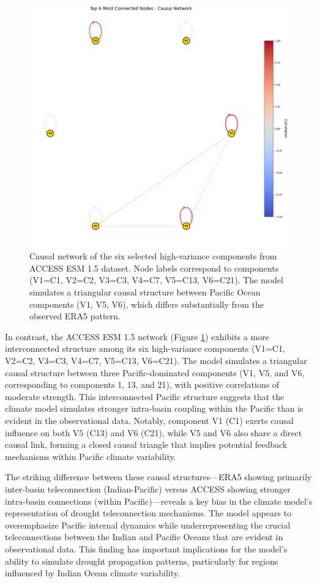 \documentclass[
]{krantz}
\begin{document}
\begin{figure}

{\centering \includegraphics[width=0.49\linewidth]{work/02-causaldisc/figures/ACCESS/ACCESS_causal_net_sel_comp} 

}

\caption{Causal network of the six selected high-variance components from ACCESS ESM 1.5 dataset. Node labels correspond to components (V1=C1, V2=C2, V3=C3, V4=C7, V5=C13, V6=C21). The model simulates a triangular causal structure between Pacific Ocean components (V1, V5, V6), which differs substantially from the observed ERA5 pattern.}\label{fig:figure8}
\end{figure}

In contrast, the ACCESS ESM 1.5 network (Figure \ref{fig:figure8}) exhibits a more interconnected structure among its six high-variance components (V1=C1, V2=C2, V3=C3, V4=C7, V5=C13, V6=C21). The model simulates a triangular causal structure between three Pacific-dominated components (V1, V5, and V6, corresponding to components 1, 13, and 21), with positive correlations of moderate strength. This interconnected Pacific structure suggests that the climate model simulates stronger intra-basin coupling within the Pacific than is evident in the observational data. Notably, component V1 (C1) exerts causal influence on both V5 (C13) and V6 (C21), while V5 and V6 also share a direct causal link, forming a closed causal triangle that implies potential feedback mechanisms within Pacific climate variability.

The striking difference between these causal structures---ERA5 showing primarily inter-basin teleconnection (Indian-Pacific) versus ACCESS showing stronger intra-basin connections (within Pacific)---reveals a key bias in the climate model's representation of drought teleconnection mechanisms. The model appears to overemphasize Pacific internal dynamics while underrepresenting the crucial teleconnections between the Indian and Pacific Oceans that are evident in observational data. This finding has important implications for the model's ability to simulate drought propagation patterns, particularly for regions influenced by Indian Ocean climate variability.
\end{document}
